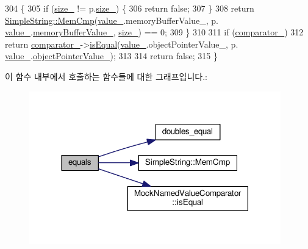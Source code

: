 \begin{DoxyCode}
304     \{
305         \textcolor{keywordflow}{if} (\hyperlink{class_mock_named_value_a5f31775800bbb46b35b5791def1f3acc}{size\_} != p.\hyperlink{class_mock_named_value_a5f31775800bbb46b35b5791def1f3acc}{size\_}) \{
306             \textcolor{keywordflow}{return} \textcolor{keyword}{false};
307         \}
308         \textcolor{keywordflow}{return} \hyperlink{class_simple_string_ae43fb6d44bec574894191bf16b4096e7}{SimpleString::MemCmp}(\hyperlink{class_mock_named_value_a68986aee29946116b59c6189c19733ac}{value\_}.memoryBufferValue\_, p.
      \hyperlink{class_mock_named_value_a68986aee29946116b59c6189c19733ac}{value\_}.\hyperlink{class_mock_named_value_acfb46de823cfde8810c5bae34dd454b2}{memoryBufferValue\_}, \hyperlink{class_mock_named_value_a5f31775800bbb46b35b5791def1f3acc}{size\_}) == 0;
309     \}
310 
311     \textcolor{keywordflow}{if} (\hyperlink{class_mock_named_value_ab6a2a3a4434b05754363c3c0137ffeb1}{comparator\_})
312         \textcolor{keywordflow}{return} \hyperlink{class_mock_named_value_ab6a2a3a4434b05754363c3c0137ffeb1}{comparator\_}->\hyperlink{class_mock_named_value_comparator_aaf682afe4e1cd4a7311c153f22db7d6f}{isEqual}(\hyperlink{class_mock_named_value_a68986aee29946116b59c6189c19733ac}{value\_}.objectPointerValue\_, p.
      \hyperlink{class_mock_named_value_a68986aee29946116b59c6189c19733ac}{value\_}.\hyperlink{class_mock_named_value_a436d0ca15a91547fb0b3a39249a42843}{objectPointerValue\_});
313 
314     \textcolor{keywordflow}{return} \textcolor{keyword}{false};
315 \}
\end{DoxyCode}


이 함수 내부에서 호출하는 함수들에 대한 그래프입니다.\+:
\nopagebreak
\begin{figure}[H]
\begin{center}
\leavevmode
\includegraphics[width=309pt]{class_mock_named_value_ae9e3bc5a05d1a0a62f2227d38135cc6a_cgraph}
\end{center}
\end{figure}





